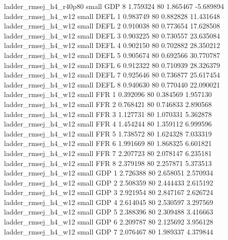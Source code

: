   ladder_rmsej_h4_r40p80      small      GDP                 8 1.759324 80       1.865467          -5.689894
     ladder_rmsej_h4_w12      small     DEFL                 1 0.983749 80       0.882828          11.431648
     ladder_rmsej_h4_w12      small     DEFL                 2 0.910038 80       0.773654          17.628508
     ladder_rmsej_h4_w12      small     DEFL                 3 0.903225 80       0.730557          23.635084
     ladder_rmsej_h4_w12      small     DEFL                 4 0.902150 80       0.702882          28.350212
     ladder_rmsej_h4_w12      small     DEFL                 5 0.905674 80       0.692566          30.770787
     ladder_rmsej_h4_w12      small     DEFL                 6 0.912322 80       0.710939          28.326379
     ladder_rmsej_h4_w12      small     DEFL                 7 0.925646 80       0.736877          25.617454
     ladder_rmsej_h4_w12      small     DEFL                 8 0.940630 80       0.770440          22.090021
     ladder_rmsej_h4_w12      small      FFR                 1 0.392096 80       0.384569           1.957130
     ladder_rmsej_h4_w12      small      FFR                 2 0.768421 80       0.746833           2.890568
     ladder_rmsej_h4_w12      small      FFR                 3 1.127731 80       1.070331           5.362878
     ladder_rmsej_h4_w12      small      FFR                 4 1.454244 80       1.359112           6.999596
     ladder_rmsej_h4_w12      small      FFR                 5 1.738572 80       1.624328           7.033319
     ladder_rmsej_h4_w12      small      FFR                 6 1.991669 80       1.868325           6.601821
     ladder_rmsej_h4_w12      small      FFR                 7 2.207723 80       2.078147           6.235181
     ladder_rmsej_h4_w12      small      FFR                 8 2.379198 80       2.257871           5.373513
     ladder_rmsej_h4_w12      small      GDP                 1 2.726388 80       2.658051           2.570934
     ladder_rmsej_h4_w12      small      GDP                 2 2.508359 80       2.444433           2.615192
     ladder_rmsej_h4_w12      small      GDP                 3 2.921954 80       2.847167           2.626724
     ladder_rmsej_h4_w12      small      GDP                 4 2.614045 80       2.530597           3.297569
     ladder_rmsej_h4_w12      small      GDP                 5 2.388396 80       2.309488           3.416663
     ladder_rmsej_h4_w12      small      GDP                 6 2.209787 80       2.125692           3.956128
     ladder_rmsej_h4_w12      small      GDP                 7 2.076467 80       1.989337           4.379844
